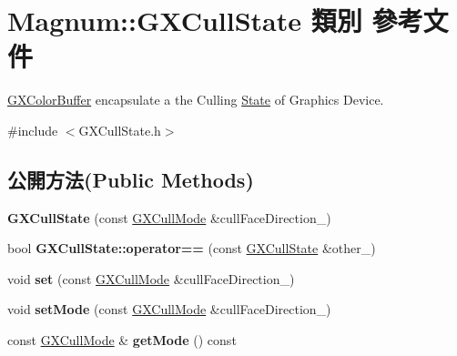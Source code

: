 \hypertarget{class_magnum_1_1_g_x_cull_state}{}\section{Magnum\+:\+:G\+X\+Cull\+State 類別 參考文件}
\label{class_magnum_1_1_g_x_cull_state}


\hyperlink{class_magnum_1_1_g_x_color_buffer}{G\+X\+Color\+Buffer} encapsulate a the Culling \hyperlink{class_magnum_1_1_state}{State} of Graphics Device.  




{\ttfamily \#include $<$G\+X\+Cull\+State.\+h$>$}

\subsection*{公開方法(Public Methods)}
\begin{DoxyCompactItemize}
\item 
{\bfseries G\+X\+Cull\+State} (const \hyperlink{class_magnum_1_1_g_x_cull_mode}{G\+X\+Cull\+Mode} \&cull\+Face\+Direction\+\_\+)\hypertarget{class_magnum_1_1_g_x_cull_state_aabfb2e0ab38ea74d56163018f8ff46fc}{}\label{class_magnum_1_1_g_x_cull_state_aabfb2e0ab38ea74d56163018f8ff46fc}

\item 
bool {\bfseries G\+X\+Cull\+State\+::operator==} (const \hyperlink{class_magnum_1_1_g_x_cull_state}{G\+X\+Cull\+State} \&other\+\_\+)\hypertarget{class_magnum_1_1_g_x_cull_state_a08c0b9bd43ce7e46b4bf232ebbde0fa4}{}\label{class_magnum_1_1_g_x_cull_state_a08c0b9bd43ce7e46b4bf232ebbde0fa4}

\item 
void {\bfseries set} (const \hyperlink{class_magnum_1_1_g_x_cull_mode}{G\+X\+Cull\+Mode} \&cull\+Face\+Direction\+\_\+)\hypertarget{class_magnum_1_1_g_x_cull_state_adf0fa8d836efda27c33e73f922a41327}{}\label{class_magnum_1_1_g_x_cull_state_adf0fa8d836efda27c33e73f922a41327}

\item 
void {\bfseries set\+Mode} (const \hyperlink{class_magnum_1_1_g_x_cull_mode}{G\+X\+Cull\+Mode} \&cull\+Face\+Direction\+\_\+)\hypertarget{class_magnum_1_1_g_x_cull_state_a0f64495295939b6f6fc1bdde4033667a}{}\label{class_magnum_1_1_g_x_cull_state_a0f64495295939b6f6fc1bdde4033667a}

\item 
const \hyperlink{class_magnum_1_1_g_x_cull_mode}{G\+X\+Cull\+Mode} \& {\bfseries get\+Mode} () const \hypertarget{class_magnum_1_1_g_x_cull_state_a8c31ce345a40093d95f8e9965e7ba43e}{}\label{class_magnum_1_1_g_x_cull_state_a8c31ce345a40093d95f8e9965e7ba43e}

\end{DoxyCompactItemize}



